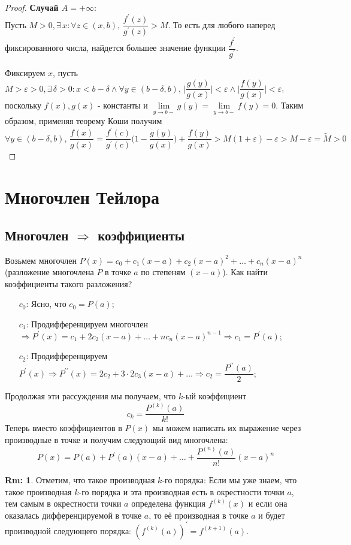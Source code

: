 \documentclass[12pt]{article}
\newcommand{\VE}{\varepsilon}
\theoremstyle{definition}
\newtheorem{rem}{Rm:}
\begin{document}
\begin{proof} \textbf{Случай $A = +\infty$}:\\
	Пусть $M > 0, \exists \, x \colon  \forall z \in (x,b), \, \dfrac{f^\prime(z)}{g^\prime(z)} > M$. То есть для любого наперед фиксированного числа, найдется большее значение функции $\dfrac{f^\prime}{g^\prime}$.
	
	Фиксируем $x$, пусть $M > \VE > 0, \exists \, \delta >0 \colon x < b -\delta \wedge \forall y \in (b -\delta,b), \, \bigg| \dfrac{g(y)}{g(x)} \bigg|< \VE \wedge \bigg|\dfrac{f(y)}{g(x)}\bigg| < \VE$, поскольку $f(x),g(x)$ - константы и $\!\lim\limits_{y \to b-}g(y) = \!\lim\limits_{y \to b-}f(y) = 0$. Таким образом, применяя теорему Коши получим
	$$\forall y \in (b-\delta, b), \, \dfrac{f(x)}{g(x)} = \dfrac{f^\prime(c)}{g^\prime(c)}\bigg(1  - \dfrac{g(y)}{g(x)}\bigg) + \dfrac{f(y)}{g(x)}  > M(1 + \VE) - \VE > M -\VE = \tilde{M} >0$$ 	
\end{proof}

\newpage
\section*{Многочлен Тейлора}
\subsection*{Многочлен $\Rightarrow$ коэффициенты}

Возьмем многочлен $P(x) = c_0 + c_1(x-a) + c_2(x-a)^2 + \dotsc + c_n(x-a)^n$ (разложение многочлена $P$ в точке $a$ по степеням $(x-a)$). Как найти коэффициенты такого разложения? 

\begin{enumerate}
	\item [$c_0$:] Ясно, что $c_0 = P(a)$;
	\item [$c_1$:] Продифференцируем многочлен $\Rightarrow P^\prime(x) = c_1 + 2c_2(x-a) + \dotsc + nc_n(x-a)^{n-1} \Rightarrow  c_1 = P^\prime(a)$;
	\item [$c_2$:] Продифференцируем $P^{\prime}(x) \Rightarrow P^{\prime\prime}(x) = 2c_2 + 3{\cdot}2c_3(x-a) + \dotsc \Rightarrow c_2 = \dfrac{P^{\prime\prime}(a)}{2}$;
\end{enumerate}

Продолжая эти рассуждения мы получаем, что $k$-ый коэффициент
$$c_k = \dfrac{P^{(k)}(a)}{k!}$$
Теперь вместо коэффициентов в $P(x)$ мы можем написать их выражение через производные в точке и получим следующий вид многочлена:
$$P(x) = P(a) + P^\prime(a)(x-a) + \dotsc + \dfrac{P^{(n)}(a)}{n!}(x-a)^n$$
\begin{rem}
	Отметим, что такое производная $k$-го порядка: Если мы уже знаем, что такое производная $k$-го порядка и эта производная есть в окрестности точки $a$, тем самым в окрестности точки $a$ определена функция $f^{(k)}(x)$ и если она оказалась дифференцируемой в точке $a$, то её производная в точке $a$ и будет производной следующего порядка: $(f^{(k)}(a))^\prime = f^{(k+1)}(a)$.
\end{rem}
\end{document}
